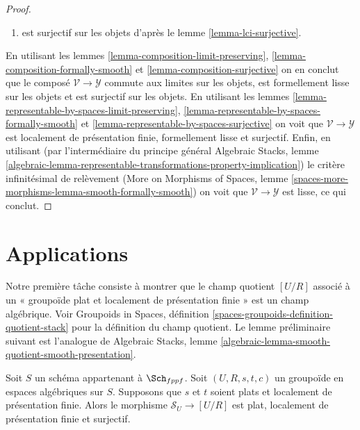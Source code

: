 \begin{proof}
\begin{enumerate}
\item est surjectif sur les objets d'après le
lemme \ref{lemma-lci-surjective}.
\end{enumerate}
En utilisant les
lemmes \ref{lemma-composition-limit-preserving},
\ref{lemma-composition-formally-smooth} et
\ref{lemma-composition-surjective}
on en conclut que le composé $\mathcal{V} \to \mathcal{Y}$
commute aux limites sur les objets, est formellement lisse sur les objets et
est surjectif sur les objets.
En utilisant les
lemmes \ref{lemma-representable-by-spaces-limit-preserving},
\ref{lemma-representable-by-spaces-formally-smooth} et
\ref{lemma-representable-by-spaces-surjective}
on voit que $\mathcal{V} \to \mathcal{Y}$ est
localement de présentation finie, formellement lisse et surjectif.
Enfin, en utilisant (par l'intermédiaire du principe général
Algebraic Stacks,
lemme \ref{algebraic-lemma-representable-transformations-property-implication})
le critère infinitésimal de relèvement
(More on Morphisms of Spaces, lemme
\ref{spaces-more-morphisms-lemma-smooth-formally-smooth})
on voit que $\mathcal{V} \to \mathcal{Y}$ est lisse, ce qui conclut.
\end{proof}








\section{Applications}
\label{section-applications}

\noindent
Notre première tâche consiste à montrer que le champ quotient $[U/R]$ associé à
un « groupoïde plat et localement de présentation finie » est un champ algébrique.
Voir
Groupoids in Spaces,
définition \ref{spaces-groupoids-definition-quotient-stack}
pour la définition du champ quotient.
Le lemme préliminaire suivant est l'analogue de
Algebraic Stacks,
lemme \ref{algebraic-lemma-smooth-quotient-smooth-presentation}.

\begin{lemma}
\label{lemma-flat-quotient-flat-presentation}
Soit $S$ un schéma appartenant à $\Sch_{fppf}$.
Soit $(U, R, s, t, c)$ un groupoïde en espaces algébriques sur $S$.
Supposons que $s$ et $t$ soient plats et localement de présentation finie.
Alors le morphisme $\mathcal{S}_U \to [U/R]$ est plat, localement de
présentation finie et surjectif.
\end{lemma}

